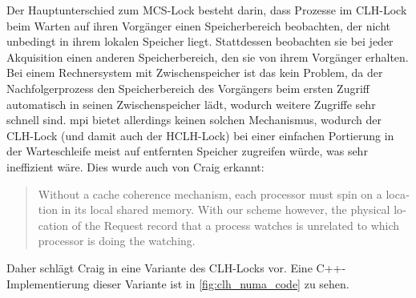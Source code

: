 Der Hauptunterschied zum MCS-Lock besteht darin,
dass Prozesse im CLH-Lock beim Warten auf ihren Vorgänger einen Speicherbereich beobachten,
der nicht unbedingt in ihrem lokalen Speicher liegt.
Stattdessen beobachten sie bei jeder Akquisition einen anderen Speicherbereich,
den sie von ihrem Vorgänger erhalten.
Bei einem Rechnersystem mit \gls{Zwischenspeicher} ist das kein Problem,
da der Nachfolgerprozess den Speicherbereich des Vorgängers
beim ersten Zugriff
automatisch in seinen \gls{Zwischenspeicher} lädt,
wodurch weitere Zugriffe sehr schnell sind.
\Gls{mpi} bietet allerdings keinen solchen Mechanismus,
wodurch der CLH-Lock (und damit auch der HCLH-Lock)
bei einer einfachen Portierung
in der Warteschleife meist auf entfernten Speicher zugreifen würde,
was sehr ineffizient wäre.
Dies wurde auch von Craig erkannt:
\foreignblockcquote{english}[S. 12]{C-Lock}{%
    Without a cache coherence mechanism, each processor must spin on a location in
    its local shared memory. With our scheme \textelp{} however,
    the physical location of the Request record that a process watches is unrelated to which
    processor is doing the watching.}.
Daher schlägt Craig in \cite{C-Lock} eine Variante des CLH-Locks vor.
Eine C++-Implementierung dieser Variante ist in \autoref{fig:clh_numa_code} zu sehen.

